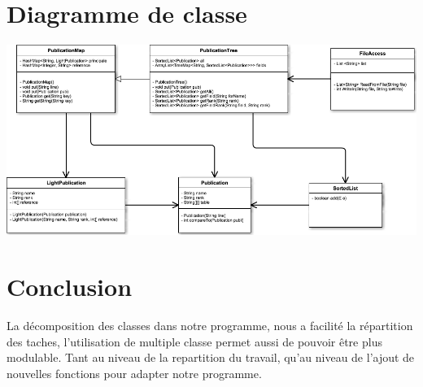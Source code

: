 \documentclass[10pt,a4paper]{article}
\begin{document}
\section*{Diagramme de classe}
\begin{center}
    \includegraphics[scale=0.5]{UML.png}
\end{center}

\section*{Conclusion}
La décomposition des classes dans notre programme, nous a facilité la répartition des taches, l'utilisation de multiple classe permet aussi de pouvoir être plus modulable. Tant au niveau de la repartition du travail, qu'au niveau de l'ajout de nouvelles fonctions pour adapter notre programme.
\end{document}
